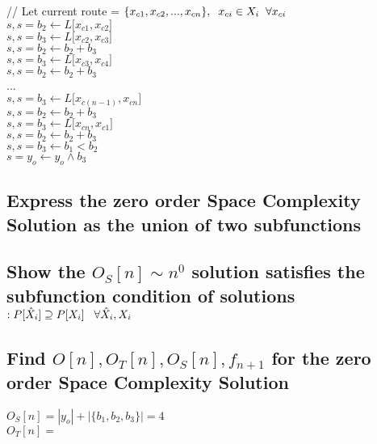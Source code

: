 \documentclass[11pt]{article}
\begin{document}
// Let current route = $\{x_{c1},x_{c2},...,x_{cn}\}, \hspace{2mm} x_{ci} \in X_i \hspace{2mm} \forall x_{ci}$\\
$s,s = b_2 \leftarrow L \lbrack {x}_{c1},{x}_{c2} \rbrack$\\
$s,s = b_3 \leftarrow L \lbrack {x}_{c2},{x}_{c3} \rbrack$\\
$s,s = b_2 \leftarrow b_2 + b_3$\\
$s,s = b_3 \leftarrow L \lbrack {x}_{c3},{x}_{c4} \rbrack$\\
$s,s = b_2 \leftarrow b_2 + b_3$\\
...\\
$s,s = b_3 \leftarrow L \lbrack {x}_{c(n-1)}, {x}_{cn} \rbrack$\\
$s,s = b_2 \leftarrow b_2 + b_3$\\
$s,s = b_3 \leftarrow L \lbrack {x}_{cn}, {x}_{c1}\rbrack$\\
$s,s = b_2 \leftarrow b_2 + b_3$\\
$s,s = b_3 \leftarrow b_1 < b_2$\\
$s = y_o \leftarrow y_o \land b_3$







\subsection{Express the zero order Space Complexity Solution as the union of two subfunctions}



\subsection{Show the $O_S[n] \sim n^0$ solution satisfies the  subfunction condition of solutions$: P[\hat{X}_i] \supseteq P[X_i] \hspace{3mm} \forall \hat{X}_i,X_i$}


\subsection{Find $O[n], O_T[n], O_S[n],f_{n+1}$ for the zero order Space Complexity Solution}
\begin{center}
$
O_S[n] = |y_o| + |\{b_1,b_2,b_3\}| = 4
$
\\ \vspace{2mm}
$
O_T[n] = 
$
\end{center}
\end{document}
